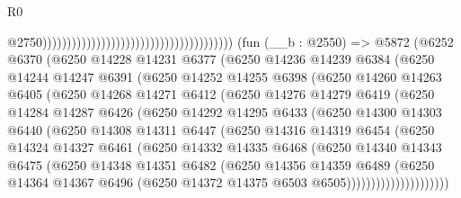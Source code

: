\begin{lexlean}{R0}
\begin{coremodule}
                                                                                  @2750)))))))))))))))))))))))))))))))))))))))
    (fun (__b : @2550) =>
    @5872
      (@6252
        @6370
        (@6250
          @14228
          @14231
          @6377
          (@6250
            @14236
            @14239
            @6384
            (@6250
              @14244
              @14247
              @6391
              (@6250
                @14252
                @14255
                @6398
                (@6250
                  @14260
                  @14263
                  @6405
                  (@6250
                    @14268
                    @14271
                    @6412
                    (@6250
                      @14276
                      @14279
                      @6419
                      (@6250
                        @14284
                        @14287
                        @6426
                        (@6250
                          @14292
                          @14295
                          @6433
                          (@6250
                            @14300
                            @14303
                            @6440
                            (@6250
                              @14308
                              @14311
                              @6447
                              (@6250
                                @14316
                                @14319
                                @6454
                                (@6250
                                  @14324
                                  @14327
                                  @6461
                                  (@6250
                                    @14332
                                    @14335
                                    @6468
                                    (@6250
                                      @14340
                                      @14343
                                      @6475
                                      (@6250
                                        @14348
                                        @14351
                                        @6482
                                        (@6250
                                          @14356
                                          @14359
                                          @6489
                                          (@6250
                                            @14364
                                            @14367
                                            @6496
                                            (@6250 @14372 @14375 @6503 @6505)))))))))))))))))))))

\end{coremodule}
\end{lexlean}
